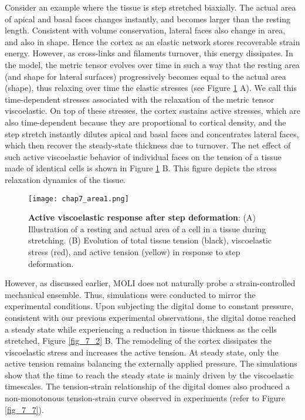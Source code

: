Consider an example where the tissue is step stretched biaxially. The actual area of apical and basal faces  changes instantly, and becomes larger than the resting length. Consistent with volume conservation, lateral faces also change in area, and also in shape. Hence the cortex as an elastic network stores recoverable strain energy. However, as cross-links and filaments turnover, this energy dissipates. In the model, the metric tensor evolves over time in such a way that the resting area (and shape for lateral surfaces) progressively becomes equal to the actual area (shape), thus relaxing over time the elastic stresses (see Figure \ref{fig_7_7a} A). We call this time-dependent stresses associated with the relaxation of the metric tensor viscoelastic. On top of these stresses, the cortex sustains active stresses, which are also time-dependent because they are proportional to cortical density, and the step stretch instantly dilutes apical and basal faces and concentrates lateral faces, which then recover the steady-state thickness due to turnover. The net effect of such active viscoelastic behavior of individual faces on the tension of a tissue made of identical cells is shown in  Figure \ref{fig_7_7a} B. This figure depicts the stress relaxation dynamics of the tissue.

\begin{figure}[b!]
	\centering
	\texttt{[image: chap7\_area1.png]}
	\caption{\label{fig_7_7a} \textbf{Active viscoelastic response after step deformation}: (A) Illustration of a resting and actual area of a cell in a tissue during stretching. (B) Evolution of total tissue tension (black), viscoelastic stress (red), and active tension (yellow) in response to step deformation.
	}
\end{figure}

However, as discussed earlier, MOLI does not naturally probe a strain-controlled mechanical ensemble. Thus,  simulations were conducted to mirror the experimental conditions. Upon subjecting the digital dome to constant pressure, consistent with our previous experimental observations, the digital dome reached a steady state while experiencing a reduction in tissue thickness as the cells stretched, Figure \ref{fig_7_2} B. The remodeling of the cortex dissipates the viscoelastic stress and increases the active tension. At steady state, only the active tension remains balancing the externally applied pressure. The simulations show that the time to reach the steady state is mainly driven by the viscoelastic timescales. The tension-strain relationship of the digital domes also produced a non-monotonous tension-strain curve observed in experiments (refer to Figure \ref{fig_7_7}).

